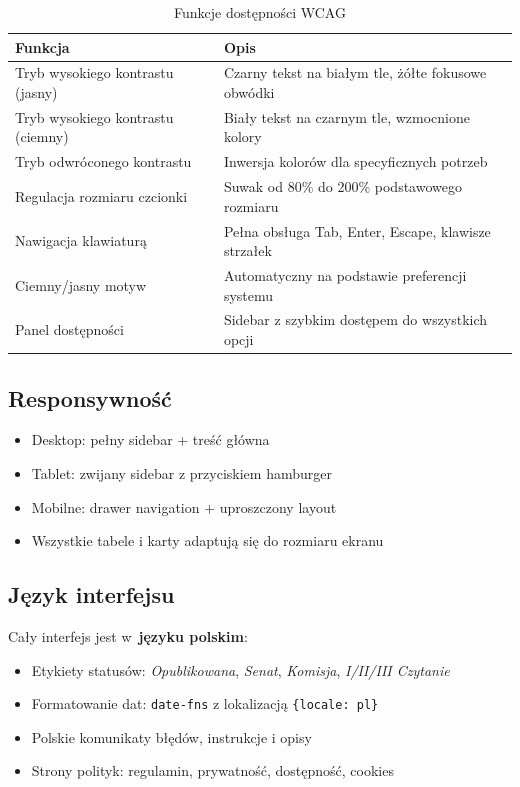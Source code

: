 \documentclass[12pt,a4paper]{article}
\begin{document}
\begin{table}[H]
\centering
\renewcommand{\arraystretch}{1.3}
\begin{tabularx}{\textwidth}{l X}
\toprule
\textbf{Funkcja} & \textbf{Opis} \\
\midrule
Tryb wysokiego kontrastu (jasny) & Czarny tekst na białym tle, żółte fokusowe obwódki \\
Tryb wysokiego kontrastu (ciemny) & Biały tekst na czarnym tle, wzmocnione kolory \\
Tryb odwróconego kontrastu & Inwersja kolorów dla specyficznych potrzeb \\
Regulacja rozmiaru czcionki & Suwak od 80\% do 200\% podstawowego rozmiaru \\
Nawigacja klawiaturą & Pełna obsługa Tab, Enter, Escape, klawisze strzałek \\
Ciemny/jasny motyw & Automatyczny na podstawie preferencji systemu \\
Panel dostępności & Sidebar z szybkim dostępem do wszystkich opcji \\
\bottomrule
\end{tabularx}
\caption{Funkcje dostępności WCAG}
\end{table}

\subsection{Responsywność}

\begin{itemize}[leftmargin=2em]
  \item Desktop: pełny sidebar + treść główna
  \item Tablet: zwijany sidebar z przyciskiem hamburger
  \item Mobilne: drawer navigation + uproszczony layout
  \item Wszystkie tabele i karty adaptują się do rozmiaru ekranu
\end{itemize}

\subsection{Język interfejsu}

Cały interfejs jest w~\textbf{języku polskim}:
\begin{itemize}[leftmargin=2em]
  \item Etykiety statusów: \textit{Opublikowana}, \textit{Senat}, \textit{Komisja}, \textit{I/II/III Czytanie}
  \item Formatowanie dat: \texttt{date-fns} z lokalizacją \texttt{\{locale: pl\}}
  \item Polskie komunikaty błędów, instrukcje i opisy
  \item Strony polityk: regulamin, prywatność, dostępność, cookies 
\end{itemize}
\end{document}
